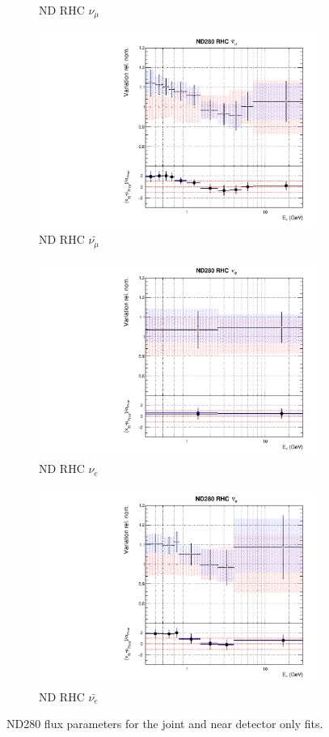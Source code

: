 \begin{figure}[!htbp]
\begin{subfigure}{0.45\textwidth}
  \caption{ND RHC $\nu_{\mu}$}
\end{subfigure}
\begin{subfigure}{0.45\textwidth}
  \centering
  \includegraphics[width=0.75\linewidth]{figs/jointflux5}
  \caption{ND RHC $\bar{\nu_{\mu}}$}
\end{subfigure}
\begin{subfigure}{0.45\textwidth}
  \centering
  \includegraphics[width=0.75\linewidth]{figs/jointflux6}
  \caption{ND RHC $\nu_{e}$}
\end{subfigure}
\begin{subfigure}{0.45\textwidth}
  \centering
  \includegraphics[width=0.75\linewidth]{figs/jointflux7}
  \caption{ND RHC $\bar{\nu_e}$}
\end{subfigure}
\caption{ND280 flux parameters for the joint and near detector only fits.}
\label{fig:jointfluxND}
\end{figure}

